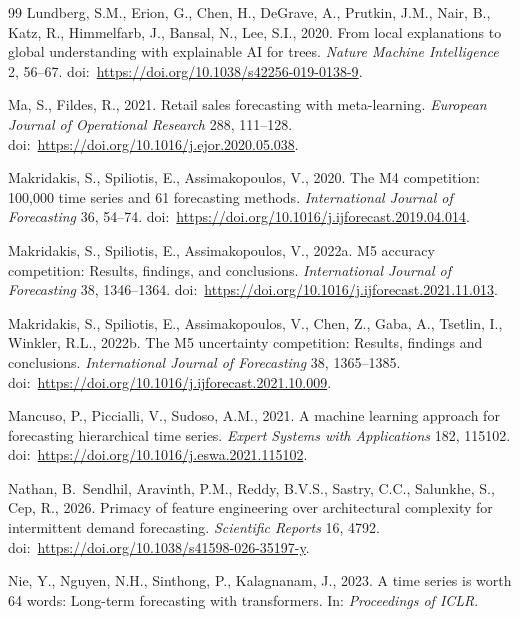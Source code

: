 \documentclass[review,authoryear]{elsarticle}
\begin{document}
\begin{thebibliography}{99}
Lundberg, S.M., Erion, G., Chen, H., DeGrave, A., Prutkin, J.M., Nair, B., Katz, R., Himmelfarb, J., Bansal, N., Lee, S.I., 2020.
From local explanations to global understanding with explainable AI for trees.
\textit{Nature Machine Intelligence} 2, 56--67.
doi:\ \url{https://doi.org/10.1038/s42256-019-0138-9}.

Ma, S., Fildes, R., 2021.
Retail sales forecasting with meta-learning.
\textit{European Journal of Operational Research} 288, 111--128.
doi:\ \url{https://doi.org/10.1016/j.ejor.2020.05.038}.

Makridakis, S., Spiliotis, E., Assimakopoulos, V., 2020.
The M4 competition: 100,000 time series and 61 forecasting methods.
\textit{International Journal of Forecasting} 36, 54--74.
doi:\ \url{https://doi.org/10.1016/j.ijforecast.2019.04.014}.

Makridakis, S., Spiliotis, E., Assimakopoulos, V., 2022a.
M5 accuracy competition: Results, findings, and conclusions.
\textit{International Journal of Forecasting} 38, 1346--1364.
doi:\ \url{https://doi.org/10.1016/j.ijforecast.2021.11.013}.

Makridakis, S., Spiliotis, E., Assimakopoulos, V., Chen, Z., Gaba, A., Tsetlin, I., Winkler, R.L., 2022b.
The M5 uncertainty competition: Results, findings and conclusions.
\textit{International Journal of Forecasting} 38, 1365--1385.
doi:\ \url{https://doi.org/10.1016/j.ijforecast.2021.10.009}.

Mancuso, P., Piccialli, V., Sudoso, A.M., 2021.
A machine learning approach for forecasting hierarchical time series.
\textit{Expert Systems with Applications} 182, 115102.
doi:\ \url{https://doi.org/10.1016/j.eswa.2021.115102}.

Nathan, B.~Sendhil, Aravinth, P.M., Reddy, B.V.S., Sastry, C.C., Salunkhe, S., Cep, R., 2026.
Primacy of feature engineering over architectural complexity for intermittent demand forecasting.
\textit{Scientific Reports} 16, 4792.
doi:\ \url{https://doi.org/10.1038/s41598-026-35197-y}.

Nie, Y., Nguyen, N.H., Sinthong, P., Kalagnanam, J., 2023.
A time series is worth 64 words: Long-term forecasting with transformers.
In: \textit{Proceedings of ICLR}.


\end{thebibliography}
\end{document}
